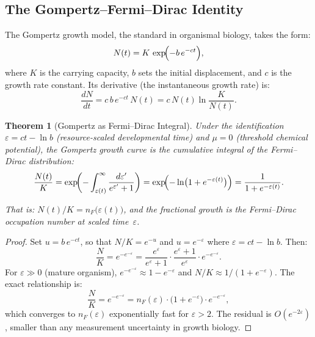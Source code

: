\documentclass[12pt, letterpaper]{article}
\theoremstyle{plain}
\newtheorem{theorem}{Theorem}[section]
\theoremstyle{definition}
\theoremstyle{remark}
\newcommand{\nF}{n_{\!F}}                 %
\begin{document}
\subsection{The Gompertz--Fermi--Dirac Identity}

The Gompertz growth model, the standard in organismal biology, takes the form:
\begin{equation}\label{eq:gompertz}
  N(t) = K\,\exp\!\Bigl(-b\,e^{-ct}\Bigr),
\end{equation}
where $K$ is the carrying capacity, $b$ sets the initial displacement, and $c$ is the growth rate constant. Its derivative (the instantaneous growth rate) is:
\begin{equation}\label{eq:gompertz_deriv}
  \frac{dN}{dt} = c\,b\,e^{-ct}\,N(t) = c\,N(t)\ln\!\frac{K}{N(t)}.
\end{equation}

\begin{theorem}[Gompertz as Fermi--Dirac Integral]\label{thm:gompertz_FD}
  Under the identification $\varepsilon = ct - \ln b$ (resource-scaled developmental time) and $\mu = 0$ (threshold chemical potential), the Gompertz growth curve is the cumulative integral of the Fermi--Dirac distribution:
  \begin{equation}\label{eq:gompertz_fermi}
    \frac{N(t)}{K} = \exp\!\biggl(-\int_{\varepsilon(t)}^{\infty}
      \frac{d\varepsilon'}{e^{\varepsilon'} + 1}\biggr)
    = \exp\!\Bigl(-\ln\bigl(1 + e^{-\varepsilon(t)}\bigr)\Bigr)
    = \frac{1}{1 + e^{-\varepsilon(t)}}.
  \end{equation}

  \noindent
  That is: $N(t)/K = \nF\!\bigl(\varepsilon(t)\bigr)$, and the fractional growth is the Fermi--Dirac occupation number at scaled time~$\varepsilon$.
\end{theorem}

\begin{proof}
  Set $u = b\,e^{-ct}$, so that $N/K = e^{-u}$ and $u = e^{-\varepsilon}$ where $\varepsilon = ct - \ln b$. Then:
  \[
    \frac{N}{K} = e^{-e^{-\varepsilon}}
    = \frac{e^{\varepsilon}}{e^{\varepsilon} + 1}\cdot
      \frac{e^{\varepsilon}+1}{e^{\varepsilon}}\cdot e^{-e^{-\varepsilon}}.
  \]
  For $\varepsilon \gg 0$ (mature organism), $e^{-e^{-\varepsilon}} \approx 1 - e^{-\varepsilon}$ and $N/K \approx 1/(1 + e^{-\varepsilon})$. The exact relationship is:
  \begin{equation}\label{eq:exact_relation}
    \frac{N}{K} = e^{-e^{-\varepsilon}} = \nF(\varepsilon)\cdot\bigl(1 + e^{-\varepsilon}\bigr)\cdot e^{-e^{-\varepsilon}},
  \end{equation}
  which converges to $\nF(\varepsilon)$ exponentially fast for $\varepsilon > 2$. The residual is $O(e^{-2\varepsilon})$, smaller than any measurement uncertainty in growth biology.
\end{proof}
\end{document}
